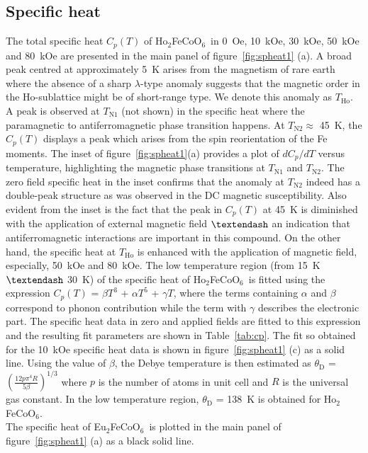 \documentclass[12pt,twocolumns]{iopart}
\newcommand{\HFCO}{Ho$_2$FeCoO$_6$}
\newcommand{\EFCO}{Eu$_2$FeCoO$_6$}
\begin{document}
\subsection{\label{spheat}Specific heat}
The total specific heat $C_p(T)$ of \HFCO\ in 0~Oe, 10~kOe, 30~kOe, 50~kOe and 80~kOe
are presented in the main panel of figure~\ref{fig:spheat1} (a).
A broad peak centred at approximately 5~K arises from the
magnetism of rare earth where the absence of a sharp $\lambda$-type anomaly
suggests that the magnetic order in the Ho-sublattice might be of short-range
type. We denote this anomaly as $T_\mathrm{Ho}$.
A peak is observed at $T_\mathrm{N1}$ (not shown) in the specific heat
where the paramagnetic to antiferromagnetic phase
transition happens.
%
At $T_\mathrm{N2} \approx$ 45~K, the $C_p(T)$ displays a peak which
arises from the spin reorientation of the Fe moments.
The inset of figure~\ref{fig:spheat1}(a) provides a plot of $dC_p/dT$ versus
temperature, highlighting the magnetic phase transitions at
$T_\mathrm{N1}$ and $T_\mathrm{N2}$.
The zero field specific heat in the inset confirms that the anomaly at
$T_\mathrm{N2}$ indeed has a double-peak structure as was
observed in the DC magnetic susceptibility.
%
Also evident from the inset is the fact that the peak in $C_p(T)$
at 45~K is diminished with the application of external magnetic field
$\textendash$ an indication that antiferromagnetic
interactions are important in this compound.
On the other hand, the specific heat at $T_\mathrm{Ho}$ is enhanced
with the application of magnetic field, especially, 50~kOe and 80~kOe.
%
The low temperature region (from 15~K $\textendash$ 30~K) of the specific heat of \HFCO\
 is fitted using the expression
$C_p(T)$ = $\beta T^3$ + $\alpha T^5$ + $\gamma T$, where the terms 
containing $\alpha$ and $\beta$ correspond to phonon contribution while 
the term with $\gamma$ describes the electronic part. The specific heat 
data in zero and applied fields are fitted to this
expression and the resulting fit parameters are shown in Table~\ref{tab:cp}.
The fit so obtained for the 10~kOe specific heat data
is shown in figure~\ref{fig:spheat1} (c) as a solid line.
Using the value of $\beta$, the
Debye temperature is then estimated as
$\theta_\mathrm{D}$ = $\left(\frac{12p\pi^4R}{5\beta}\right)^{1/3}$
where $p$ is the number of atoms in unit cell and $R$ 
is the universal gas constant. In the low temperature region,
$\theta_\mathrm{D}$ = 138~K is obtained for \HFCO  .
\\
%
\indent
The specific heat of \EFCO\ is plotted in the main panel of
figure~\ref{fig:spheat1} (a) as a black solid line.
\end{document}
